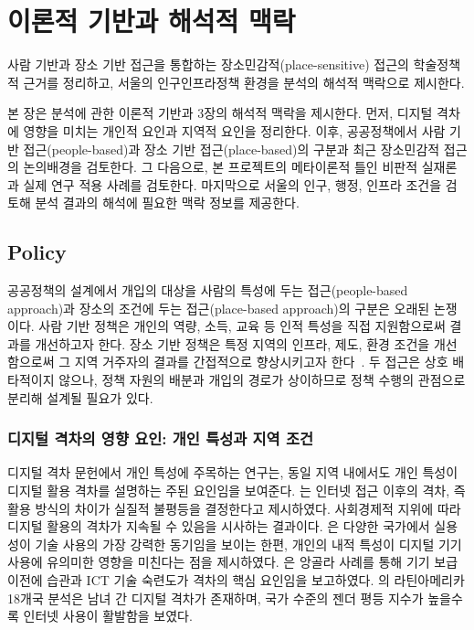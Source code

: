 \section{이론적 기반과 해석적 맥락}
\label{sec:theory}


\begin{quoteblock}
사람 기반과 장소 기반 접근을 통합하는 장소민감적(place-sensitive) 접근의 학술\textperiodcentered{}정책적 근거를 정리하고, 서울의 인구\textperiodcentered{}인프라\textperiodcentered{}정책 환경을 분석의 해석적 맥락으로 제시한다.
\end{quoteblock}

본 장은 분석에 관한 이론적 기반과 3장의 해석적 맥락을 제시한다. 먼저, 디지털 격차에 영향을 미치는 개인적 요인과 지역적 요인을 정리한다. 이후, 공공정책에서 사람 기반 접근(people-based)과 장소 기반 접근(place-based)의 구분과 최근 장소민감적 접근의 논의배경을 검토한다. 그 다음으로, 본 프로젝트의 메타이론적 틀인 비판적 실재론과 실제 연구 적용 사례를 검토한다. 마지막으로 서울의 인구, 행정, 인프라 조건을 검토해 분석 결과의 해석에 필요한 맥락 정보를 제공한다.

\subsection{Policy}
\label{subsec:2-1}

공공정책의 설계에서 개입의 대상을 사람의 특성에 두는 접근(people-based approach)과 장소의 조건에 두는 접근(place-based approach)의 구분은 오래된 논쟁이다. 사람 기반 정책은 개인의 역량, 소득, 교육 등 인적 특성을 직접 지원함으로써 결과를 개선하고자 한다. 장소 기반 정책은 특정 지역의 인프라, 제도, 환경 조건을 개선함으로써 그 지역 거주자의 결과를 간접적으로 향상시키고자 한다~\citep{NeumarkSimpson2015}. 두 접근은 상호 배타적이지 않으나, 정책 자원의 배분과 개입의 경로가 상이하므로 정책 수행의 관점으로 분리해 설계될 필요가 있다.

\subsubsection{디지털 격차의 영향 요인: 개인 특성과 지역 조건}
\label{subsubsec:2-1-1}

디지털 격차 문헌에서 개인 특성에 주목하는 연구는, 동일 지역 내에서도 개인 특성이 디지털 활용 격차를 설명하는 주된 요인임을 보여준다. \citet{Hargittai2010}는 인터넷 접근 이후의 격차, 즉 활용 방식의 차이가 실질적 불평등을 결정한다고 제시하였다. 사회경제적 지위에 따라 디지털 활용의 격차가 지속될 수 있음을 시사하는 결과이다. \citet{ChipevaEtAl2018}은 다양한 국가에서 실용성이 기술 사용의 가장 강력한 동기임을 보이는 한편, 개인의 내적 특성이 디지털 기기 사용에 유의미한 영향을 미친다는 점을 제시하였다. \citet{BorgesEtAl2020}은 앙골라 사례를 통해 기기 보급 이전에 습관과 ICT 기술 숙련도가 격차의 핵심 요인임을 보고하였다. \citet{Hilbert2011}의 라틴아메리카 18개국 분석은 남녀 간 디지털 격차가 존재하며, 국가 수준의 젠더 평등 지수가 높을수록 인터넷 사용이 활발함을 보였다.

